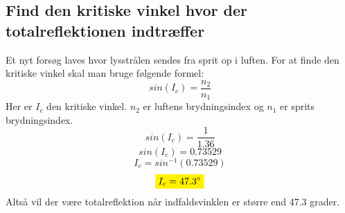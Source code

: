\subsection{Find den kritiske vinkel hvor der totalreflektionen indtræffer}
Et nyt forsøg laves hvor lysstrålen sendes fra sprit op i luften. 
For at finde den kritiske vinkel skal man bruge følgende formel:
\begin{equation*}
    sin(I_c)=\frac{n_2}{n_1}
\end{equation*}
Her er \begin{math}I_c\end{math} den kritiske vinkel. \begin{math}n_2\end{math} er luftens brydningsindex og \begin{math}n_1\end{math} er sprits brydningsindex.
\begin{equation*}
    sin(I_c)=\frac{1}{1.36}
\end{equation*}
\begin{equation*}
    sin(I_c)=0.73529
\end{equation*}
\begin{equation*}
    I_c=sin^{-1}(0.73529)
\end{equation*}
\begin{equation*}
    \mathcolorbox{yellow}{I_c=47.3^{\circ}}
\end{equation*}
Altså vil der være totalreflektion når indfaldsvinklen er større end 47.3 grader.
\newpage